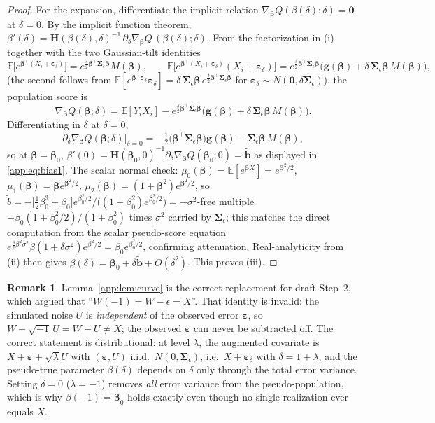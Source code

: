 \documentclass[11pt]{article}
\theoremstyle{plain}
\theoremstyle{definition}
\newtheorem{remark}{Remark}
\newcommand{\E}{\mathbb{E}}
\newcommand{\bet}{\bm{\beta}}
\newcommand{\beps}{\bm{\varepsilon}}
\newcommand{\bSig}{\bm{\Sigma}}
\begin{document}
\begin{proof}
For the expansion, differentiate the implicit relation
$\nabla_{\bet} Q(\beta(\delta);\delta)=\bm 0$ at $\delta=0$. By the implicit
function theorem, $\beta'(\delta)=\bm H(\beta(\delta),\delta)^{-1}\,
\partial_\delta\nabla_{\bet} Q\,(\beta(\delta);\delta)$. From the
factorization in (i) together with the two Gaussian-tilt identities
\[
  \E\bigl[e^{\bet^\top(X_i+\beps_\delta)}\bigr]
  =e^{\frac{\delta}{2}\bet^\top\bSig_\epsilon\bet}M(\bet),
  \qquad
  \E\bigl[e^{\bet^\top(X_i+\beps_\delta)}(X_i+\beps_\delta)\bigr]
  =e^{\frac{\delta}{2}\bet^\top\bSig_\epsilon\bet}
   \bigl(\bm g(\bet)+\delta\,\bSig_\epsilon\bet\,M(\bet)\bigr),
\]
(the second follows from
$\E[e^{\bet^\top\beps_\delta}\beps_\delta]
=\delta\,\bSig_\epsilon\bet\,e^{\frac{\delta}{2}\bet^\top\bSig_\epsilon\bet}$
for $\beps_\delta\sim N(\bm 0,\delta\bSig_\epsilon)$), the population score
is
\[
  \nabla_{\bet} Q(\bet;\delta)=\E[Y_iX_i]
  -e^{\frac{\delta}{2}\bet^\top\bSig_\epsilon\bet}
  \bigl(\bm g(\bet)+\delta\,\bSig_\epsilon\bet\,M(\bet)\bigr).
\]
Differentiating in $\delta$ at $\delta=0$,
\[
  \partial_\delta\nabla_{\bet} Q(\bet;\delta)\big|_{\delta=0}
  =-\tfrac12\bigl(\bet^\top\bSig_\epsilon\bet\bigr)\bm g(\bet)
   -\bSig_\epsilon\bet\,M(\bet),
\]
so at $\bet=\bet_0$,
$\beta'(0)=\bm H(\bet_0,0)^{-1}\partial_\delta\nabla_{\bet} Q(\bet_0;0)
=\tilde{\bm b}$ as displayed in \eqref{app:eq:bias1}. The scalar normal check:
$\mu_0(\bet)=\E[e^{\bet X}]=e^{\bet^2/2}$,
$\mu_1(\bet)=\bet e^{\bet^2/2}$,
$\mu_2(\bet)=(1+\bet^2)e^{\bet^2/2}$, so
$\tilde b=-\bigl[\tfrac12\beta_0^3+\beta_0\bigr]e^{\beta_0^2/2}
/\bigl((1+\beta_0^2)e^{\beta_0^2/2}\bigr)
=-\sigma^2$-free multiple $-\beta_0(1+\beta_0^2/2)/(1+\beta_0^2)$
times $\sigma^2$ carried by $\bSig_\epsilon$; this matches the direct
computation from the scalar pseudo-score equation
$e^{\frac{\delta}{2}\beta^2\sigma^2}\beta(1+\delta\sigma^2)e^{\beta^2/2}
=\beta_0e^{\beta_0^2/2}$, confirming attenuation. Real-analyticity from
(ii) then gives $\beta(\delta)=\bet_0+\delta\tilde{\bm b}+O(\delta^2)$.
This proves (iii).
\end{proof}

\begin{remark}
Lemma~\ref{app:lem:curve} is the correct replacement for draft Step~2, which
argued that ``$W(-1)=W-\epsilon=X$''. That identity is invalid: the
simulated noise $U$ is \emph{independent} of the observed error $\beps$,
so $W-\sqrt{-1}\,U=W-U\neq X$; the observed $\beps$ can never be
subtracted off. The correct statement is distributional: at level
$\lambda$, the augmented covariate is $X+\beps+\sqrt\lambda U$ with
$(\beps,U)$ i.i.d.\ $N(0,\bSig_\epsilon)$, i.e.\ $X+\beps_\delta$ with
$\delta=1+\lambda$, and the pseudo-true parameter $\beta(\delta)$ depends
on $\delta$ only through the total error variance. Setting $\delta=0$
($\lambda=-1$) removes \emph{all} error variance from the pseudo-population,
which is why $\beta(-1)=\bet_0$ holds exactly even though no single
realization ever equals $X$.
\end{remark}
\end{document}
